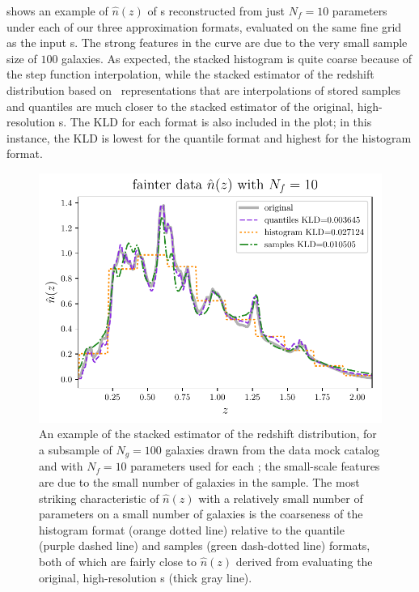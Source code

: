  shows an example of $\hat{n}(z)$ of \pz s 
reconstructed from just $N_{f}=10$ parameters under each of our three 
approximation formats, evaluated on the same fine grid as the input \pz s.
The strong features in the curve are due to the very small sample size of $100$ 
galaxies.
As expected, the stacked histogram is quite coarse because of the step function 
interpolation, while the stacked estimator of the redshift distribution based 
on \pz\ representations that are interpolations of stored samples and quantiles 
are much closer to the stacked estimator of the original, high-resolution \pz s.
The KLD for each format is also included in the plot; in this instance, the KLD 
is lowest for the quantile format and highest for the histogram format.

\begin{figure}
	\begin{center}
		\includegraphics[width=0.5\columnwidth]{figures/qp/stacked.pdf}
		\caption{An example of the stacked estimator of the redshift distribution, 
			for a subsample of $N_{g}=100$ galaxies drawn from the \ssdata data mock 
			catalog and with $N_{f}=10$ parameters used for each \pz; the small-scale 
			features are due to the small number of galaxies in the sample.
			The most striking characteristic of $\hat{n}(z)$ with a relatively small 
			number of parameters on a small number of galaxies is the coarseness of the 
			histogram format (orange dotted line) relative to the quantile (purple dashed 
			line) and samples (green dash-dotted line) formats, both of which are fairly 
			close to $\hat{n}(z)$ derived from evaluating the original, high-resolution \pz 
			s (thick gray line).
			}
	\end{center}
\end{figure}

